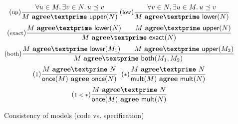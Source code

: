 \documentclass[10pt,preprint,numbers]{sigplanconf}
\theoremstyle{definition}
\newcommand{\trule}[1]{{\footnotesize{(\text{#1})}}}
\newcommand{\consName}{\textbf{agree\textprime}}
\newcommand{\cons}[2]{#1 \,\, \consName{} \,\, #2}
\newcommand{\consAName}{\textbf{agree}}
\newcommand{\consA}[2]{#1 \,\, \consAName{} \,\, #2}
\begin{document}
\begin{figure}[t]
\vspace{-0.5em}
\begin{align*}
\hspace{-0.5em}
\begin{array}{c}
\trule{up}\dfrac{\forall u \in M, \exists v \in N .  \, u \preceq v}
      {\cons{M}{\textsf{upper}(N)}}
\,
\trule{low}\dfrac{\forall v \in N, \exists u \in M . \, u \preceq v}
      {\cons{M}{\textsf{lower}(N)}} \\[1.2em]
\trule{exact}\dfrac{\cons{M}{\textsf{lower}(N)} \qquad \cons{M}{\textsf{upper}(N)}}
  {\cons{M}{\textsf{exact}(N)}} \\[1.2em]
\trule{both}\dfrac{\cons{M}{\textsf{lower}(M_1)} \qquad \cons{M}{\textsf{upper}(M_2)}}
  {\cons{M}{\textsf{both}(M_1, M_2)}}\\[1.2em]
\trule{$1$}
\dfrac{\cons{M}{N}}{\consA{\textsf{once}(M)}{\textsf{once}(N)}}
\;\;
\trule{$*$}
\dfrac{\cons{M}{N}}{\consA{\textsf{mult}(M)}{\textsf{mult}(N)}}
  \\[1.2em]
\trule{$1 < *$}
\dfrac{\cons{M}{N}}{\consA{\textsf{once}(M)}{\textsf{mult}(N)}}
\end{array}
\end{align*}
\vspace{-0.5em}
\caption{Consistency of models (code vs. specification)}
\label{fig:consistency}
\vspace{-0.9em}
\end{figure}
\end{document}
